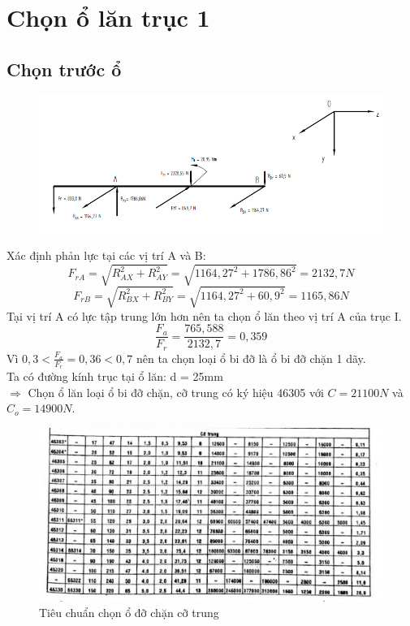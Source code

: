 \section{Chọn ổ lăn trục 1}
\subsection{Chọn trước ổ}
\begin{figure}[H]
    \centering
    \includegraphics[width=1\textwidth]{pictures/tinholan1.png}
\end{figure}
Xác định phản lực tại các vị trí A và B:
\[
    F_{rA} = \sqrt{R_{AX}^2 + R_{AY}^2} = \sqrt{1164,27^2 + 1786,86^2} = 2132,7N
\]
\[
    F_{rB} = \sqrt{R_{BX}^2 + R_{BY}^2} = \sqrt{1164,27^2 + 60,9^2} = 1165,86N
\]
Tại vị trí A có lực tập trung lớn hơn nên ta chọn ổ lăn theo vị trí A của trục I.
\[
    \frac{F_a}{F_r} = \frac{765,588}{2132,7} = 0,359
\]
Vì $0,3 < \frac{F_a}{F_r} = 0,36 < 0,7$ nên ta chọn loại ổ bi đỡ là ổ bi đỡ chặn 1 dãy. \\
Ta có đường kính trục tại ổ lăn: d = 25mm \\
$\Rightarrow$ Chọn ổ lăn loại ổ bi đỡ chặn, cỡ trung có ký hiệu 46305 với $C = 21100N$ và $C_o = 14900N$.
\begin{figure}[H]
    \centering
    \includegraphics[width=1\textwidth]{pictures/chono1.png}
    \caption{Tiêu chuẩn chọn ổ đỡ chặn cỡ trung}
\end{figure}
